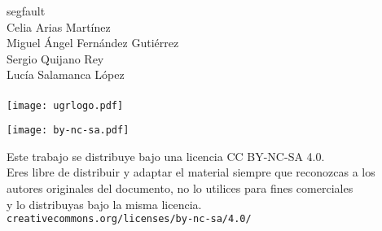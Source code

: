 \documentclass[10pt, a4paper]{article}
\theoremstyle{theorem-style}
\theoremstyle{theorem-style}
\theoremstyle{definition-style}
\theoremstyle{remark-style}
\theoremstyle{example-style}
\theoremstyle{definition-style}
\theoremstyle{remark-style}
\newcommand{\autor}{Celia Arias Martínez\\Miguel Ángel Fernández Gutiérrez\\Sergio Quijano Rey\\Lucía Salamanca López\\\hspace{1cm}}
\newcommand{\grado}{segfault}
\begin{document}

\afterpage{\restorepagecolor} %
\begin{titlepage}

	\parbox[t]{\textwidth}{
			\raggedright %
			\fontsize{40pt}{40pt}\selectfont\sffamily{}
	}

	\vfill

	\parbox[t]{\textwidth}{
		\raggedright %
		\sffamily\large\color{white}
		\grado\\
		{\Large \autor }\\[15pt]
		\texttt{[image: ugrlogo.pdf]}
	}

\end{titlepage}


\thispagestyle{empty}
\null
\vfill

\parbox[t]{\textwidth}{
  \texttt{[image: by-nc-sa.pdf]}\\[4pt]
  \raggedright %
  \sffamily\large
  {\Large Este trabajo se distribuye bajo una licencia CC BY-NC-SA 4.0.}\\[4pt]
  Eres libre de distribuir y adaptar el material siempre que reconozcas a los\\
  autores originales del documento, no lo utilices para fines comerciales\\
  y lo distribuyas bajo la misma licencia.\\[4pt]
  \texttt{creativecommons.org/licenses/by-nc-sa/4.0/}
}

\end{document}
